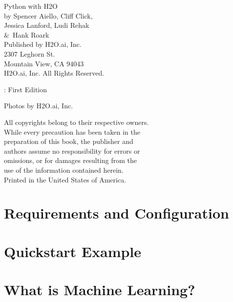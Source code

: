 {\raggedright 

Python with H2O\\

  by Spencer Aiello, Cliff Click, \\ 
Jessica Lanford, Ludi Rehak \\
\&\  Hank Roark\\
\bigskip
  Published by H2O.ai, Inc. \\
2307 Leghorn St. \\
Mountain View, CA 94043\\
\bigskip
\textcopyright \the\year \hspace{1pt} H2O.ai, Inc. All Rights Reserved. 
\bigskip

\monthname \hspace{1pt}  \the\year: First Edition 
\bigskip

Photos by \textcopyright H2O.ai, Inc.
\bigskip

All copyrights belong to their respective owners.\\
While every precaution has been taken in the\\
preparation of this book, the publisher and\\
authors assume no responsibility for errors or\\
omissions, or for damages resulting from the\\
use of the information contained herein.\\
\bigskip
Printed in the United States of America. 
}


\newpage
\thispagestyle{empty}%

\tableofcontents


\newpage



\newpage

\section{Requirements and Configuration}



\section{Quickstart Example}

\section{What is Machine Learning?}


